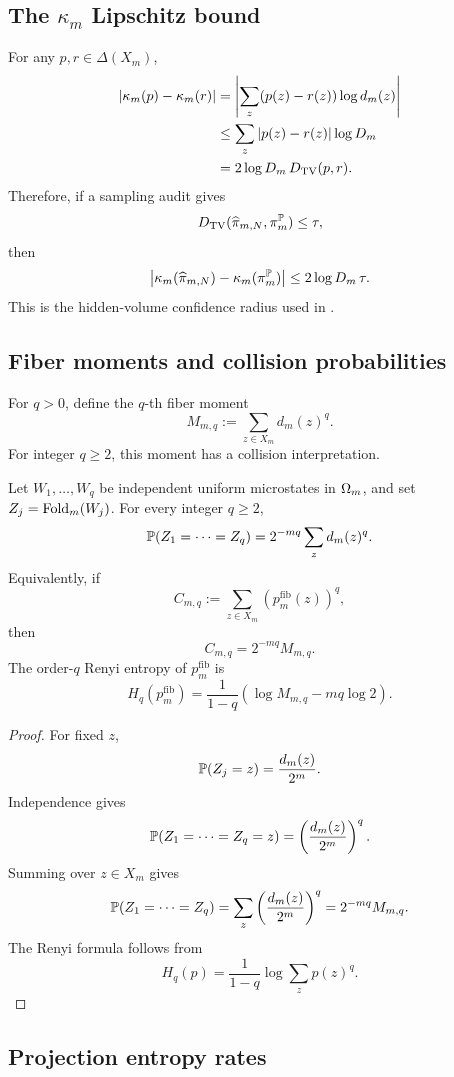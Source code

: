 \subsection{The \texorpdfstring{\(\kappa_m\)}{kappa m} Lipschitz bound}

For any \(p,r\in\Delta(X_m)\),
\[
\begin{aligned}
\left|\kappa_m(p)-\kappa_m(r)\right|
&=
\left|\sum_z(p(z)-r(z))\log d_m(z)\right|  \\
&\le
\sum_z\left|p(z)-r(z)\right|\log D_m  \\
&=
2\log D_m\,D_{\mathrm{TV}}(p,r).
\end{aligned}
\]
Therefore, if a sampling audit gives
\[
D_{\mathrm{TV}}(\widehat\pi_{m,N},\pi_m^{\mathbb{P}})\le \tau,
\]
then
\[
\left|\kappa_m(\widehat\pi_{m,N})-\kappa_m(\pi_m^{\mathbb{P}})\right|
\le
2\log D_m\,\tau.
\]
This is the hidden-volume confidence radius used in .

\subsection{Fiber moments and collision probabilities}

For \(q>0\), define the \(q\)-th fiber moment
\[
M_{m,q}:=\sum_{z\in X_m}d_m(z)^q.
\]
For integer \(q\ge2\), this moment has a collision interpretation.

\begin{theorem}
\label{thm:collision-renyi}
Let \(W_1,\ldots,W_q\) be independent uniform microstates in \(\Omega_m\), and set \(Z_j=\operatorname{Fold}_m(W_j)\).  For every integer \(q\ge2\),
\[
\mathbb{P}(Z_1=\cdots=Z_q)=2^{-mq}\sum_z d_m(z)^q.
\]
Equivalently, if
\[
C_{m,q}:=\sum_{z\in X_m}\left(p_m^{\mathrm{fib}}(z)\right)^q,
\]
then
\[
C_{m,q}=2^{-mq}M_{m,q}.
\]
The order-\(q\) Renyi entropy of \(p_m^{\mathrm{fib}}\) is
\[
H_q(p_m^{\mathrm{fib}})
=
\frac1{1-q}\left(\log M_{m,q}-mq\log2\right).
\]
\end{theorem}

\begin{proof}
For fixed \(z\),
\[
\mathbb{P}(Z_j=z)=\frac{d_m(z)}{2^m}.
\]
Independence gives
\[
\mathbb{P}(Z_1=\cdots=Z_q=z)
=
\left(\frac{d_m(z)}{2^m}\right)^q.
\]
Summing over \(z\in X_m\) gives
\[
\mathbb{P}(Z_1=\cdots=Z_q)
=
\sum_z\left(\frac{d_m(z)}{2^m}\right)^q
=
2^{-mq}M_{m,q}.
\]
The Renyi formula follows from
\[
H_q(p)=\frac1{1-q}\log\sum_zp(z)^q .
\]
\end{proof}

\subsection{Projection entropy rates}

